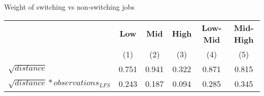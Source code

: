 \begin{center}
\begin{threeparttable}[!h]
\caption{Weight of switching vs non-switching jobs}
\begin{tabular}{lccccc}
\toprule
\toprule
&\multicolumn{1}{c}{\textbf{Low}}&\multicolumn{1}{c}{\textbf{Mid}}&\multicolumn{1}{c}{\textbf{High}}&\multicolumn{1}{c}{\textbf{Low-Mid}}&\multicolumn{1}{c}{\textbf{Mid-High}} \\
\textbf{}&\multicolumn{1}{c}{(1)}&\multicolumn{1}{c}{(2)}&\multicolumn{1}{c}{(3)}&\multicolumn{1}{c}{(4)}&\multicolumn{1}{c}{(5)} \\
\midrule
$ \sqrt{distance}$&       0.751&       0.941&       0.322&       0.871&       0.815\\
$ \sqrt{distance}*observations_{LFS} $&       0.243&       0.187&       0.094&       0.285&       0.345\\
\bottomrule
\bottomrule
\end{tabular}
\end{threeparttable}
\end{center}

